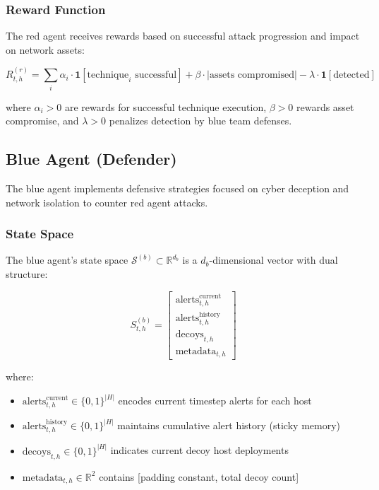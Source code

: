 \documentclass[11pt]{article}
\theoremstyle{definition}
\theoremstyle{plain}
\newcommand{\MC}[1]{\mathcal{#1}}
\begin{document}
\subsubsection{Reward Function}
The red agent receives rewards based on successful attack progression and impact on network assets:

\begin{equation}
R_{t,h}^{(r)} = \sum_{i} \alpha_i \cdot \mathbf{1}[\text{technique}_i \text{ successful}] + \beta \cdot |\text{assets compromised}| - \lambda \cdot \mathbf{1}[\text{detected}]
\end{equation}

where $\alpha_i > 0$ are rewards for successful technique execution, $\beta > 0$ rewards asset compromise, and $\lambda > 0$ penalizes detection by blue team defenses.

\subsection{Blue Agent (Defender)}

The blue agent implements defensive strategies focused on cyber deception and network isolation to counter red agent attacks.

\subsubsection{State Space}
The blue agent's state space $\MC{S}^{(b)} \subset \mathbb{R}^{d_b}$ is a $d_b$-dimensional vector with dual structure:

\begin{equation}
S_{t,h}^{(b)} = \begin{bmatrix}
\text{alerts}_{t,h}^{\text{current}} \\
\text{alerts}_{t,h}^{\text{history}} \\
\text{decoys}_{t,h} \\
\text{metadata}_{t,h}
\end{bmatrix}
\end{equation}

where:
\begin{itemize}
    \item $\text{alerts}_{t,h}^{\text{current}} \in \{0,1\}^{|H|}$ encodes current timestep alerts for each host
    \item $\text{alerts}_{t,h}^{\text{history}} \in \{0,1\}^{|H|}$ maintains cumulative alert history (sticky memory)
    \item $\text{decoys}_{t,h} \in \{0,1\}^{|H|}$ indicates current decoy host deployments
    \item $\text{metadata}_{t,h} \in \mathbb{R}^2$ contains [padding constant, total decoy count]
\end{itemize}
\end{document}
